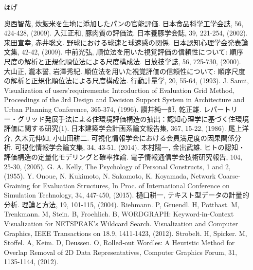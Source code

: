 \documentclass[syuuron]{kuee}
\begin{document}
\begin{acknowledgements}
	ほげ
\end{acknowledgements}





\begin{thebibliography}{数字}
	 奥西智哉, 炊飯米を生地に添加したパンの官能評価. 日本食品科学工学会誌, 56, 424-428, (2009).
	 入江正和, 豚肉質の評価法. 日本養豚学会誌, 39, 221-254, (2002).
	 来田宣幸, 赤井聡文. 野球における球速と球速感の関係. 日本認知心理学会発表論文集, 42-42, (2009).
	 中前光弘, 順位法を用いた視覚評価の信頼性について: 順序尺度の解析と正規化順位法による尺度構成法. 日放技学誌, 56, 725-730, (2000).
	 大山正, 瀧本誓, 岩澤秀紀. 順位法を用いた視覚評価の信頼性について: 順序尺度の解析と正規化順位法による尺度構成法. 行動計量学, 20, 55-64, (1993).
	 J. Sanui, Visualization of users’requirements: Introduction of Evaluation Grid Method, Proceedings of the 3rd Design and Decision Support System in Architecture and Urban Planning Conference, 365-374, (1996).
	 讃井純一郎, 乾正雄. レパートリー・グリッド発展手法による住環境評価構造の抽出：認知心理学に基づく住環境評価に関する研究(1). 日本建築学会計画系論文報告集, 367, 15-22, (1986).
	 尾上洋介, 久木元伸如, 小山田耕二. 可視化情報学会における会員満足度の因果関係分析. 可視化情報学会論文集, 34, 43-51, (2014).
	 本村陽一, 金出武雄. ヒトの認知・評価構造の定量化モデリングと確率推論. 電子情報通信学会技術研究報告, 104, 25-30, (2005).
	 G. A. Kelly, The Psychology of Personal Constructs, 1 and 2, (1955).
	 Y. Onoue, N. Kukimoto, N. Sakamoto, K. Koyamada, Network Coarse-Graining for Evaluation Structures, In Proc. of International Conference on Simulation Technology, 34, 447-450, (2015). 
	 樋口耕一, テキスト型データの計量的分析. 理論と方法, 19, 101-115, (2004).
	 Riehmann. P, Gruendl. H, Potthast. M, Trenkmann. M, Stein. B, Froehlich. B, WORDGRAPH: Keyword-in-Context Visualization for NETSPEAK's Wildcard Search. Visualization and Computer Graphics, IEEE Transactions on 18.9, 1411-1423, (2012).
	 Strobelt. H, Spicker. M, Stoffel. A, Keim. D, Deussen. O, Rolled‐out Wordles: A Heuristic Method for Overlap Removal of 2D Data Representatives, Computer Graphics Forum, 31, 1135-1144, (2012).

\end{thebibliography}
\end{document}
